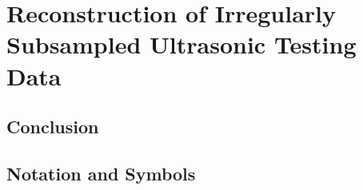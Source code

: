 \documentclass[		a4paper,
								oneside,
								11pt,
								headinclude,
								BCOR=17mm,        %
								headsepline,     %
								footsepline,
								]{scrreprt}%
\begin{document}
\part[Results]{Reconstruction of Irregularly Subsampled Ultrasonic Testing Data} \label{part_results} 


\clearpage
\pagebreak


%
\chapter*{Conclusion} 
%




\pagebreak
\appendix


\newpage
\pagebreak

\chapter*{Notation and Symbols}

\pagebreak

\printglossaries
\pagebreak


%

\newpage
{} %

\end{document}
